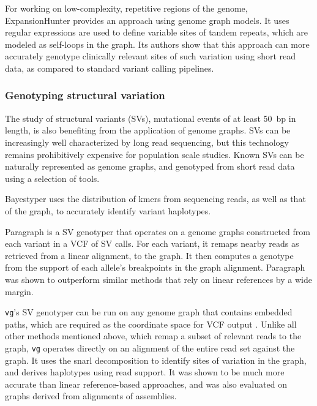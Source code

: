 For working on low-complexity, repetitive regions of the genome, ExpansionHunter \cite{dolzhenko2019expansionhunter} provides an approach using genome graph models.
It uses regular expressions are used to define variable sites of tandem repeats, which are modeled as self-loops in the graph.
Its authors show that this approach can more accurately genotype clinically relevant sites of such variation using short read data, as compared to standard variant calling pipelines.

\subsubsection{Genotyping structural variation}

The study of structural variants (SVs), mutational events of at least 50~bp in length, is also benefiting from the application of genome graphs.
SVs can be increasingly well characterized by long read sequencing, but this technology remains prohibitively expensive for population scale studies.
Known SVs can be naturally represented as genome graphs, and genotyped from short read data using a selection of tools.

Bayestyper \cite{sibbesen2018accurate} uses the distribution of kmers from sequencing reads, as well as that of the graph, to accurately identify variant haplotypes.

Paragraph \cite{chen2019paragraph} is a SV genotyper that operates on a genome graphs constructed from each variant in a VCF of SV calls.
For each variant, it remaps nearby reads as retrieved from a linear alignment, to the graph.
It then computes a genotype from the support of each allele's breakpoints in the graph alignment.
Paragraph was shown to outperform similar methods that rely on linear references by a wide margin.

\texttt{vg}'s SV genotyper can be run on any genome graph that contains embedded paths, which are required as the coordinate space for VCF output \cite{hickey2019genotyping}.
Unlike all other methods mentioned above, which remap a subset of relevant reads to the graph, \texttt{vg} operates directly on an alignment of the entire read set against the graph.
It uses the snarl decomposition \cite{paten2018superbubbles} to identify sites of variation in the graph, and derives haplotypes using read support.
It was shown to be much more accurate than linear reference-based approaches, and was also evaluated on graphs derived from alignments of assemblies.

